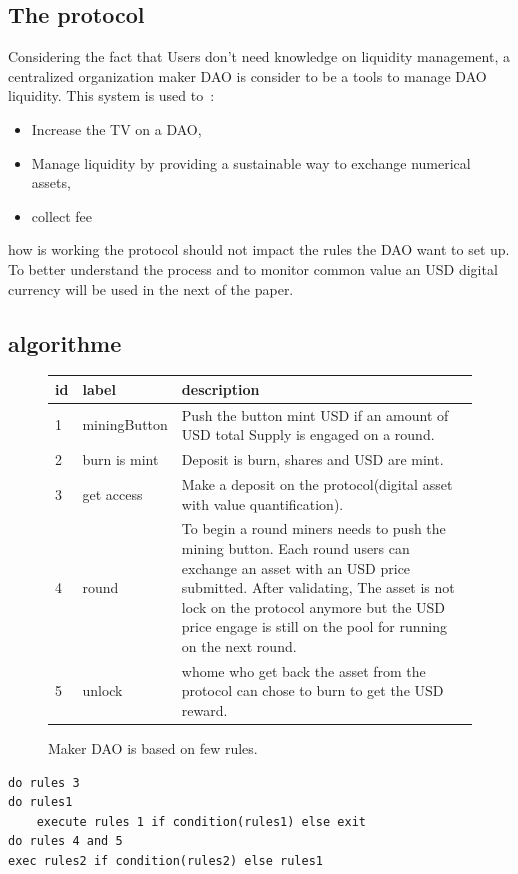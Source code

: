 \documentclass{article}
\begin{document}
\begin{multicols}{2}[]
\section{The protocol} 
Considering the fact that Users don’t need knowledge on liquidity management, a centralized organization maker DAO is consider to be a tools to manage DAO liquidity. This system is used to :
\begin{itemize}
	\item  Increase the TV on a DAO,
	\item Manage liquidity by providing a sustainable way to exchange numerical assets,
	\item collect fee 
\end{itemize}
how is working the protocol should not impact the rules the DAO want to set up. To better understand the process and to monitor common value an USD digital currency will be used in the next of the paper.
\subsection{algorithme}

\begin{figure}[H]
\begin{tabular}{ | m{0.1cm} | m{2cm}| m{5cm} | } 
\hline
id & label & description \\ \hline\hline
1 & miningButton & Push the button mint USD if an amount of USD total Supply is engaged on a round. \\ \hline
2 & burn is mint & Deposit is burn, shares and USD are mint. \\ \hline
3 & get access & Make a deposit on the protocol(digital asset with value quantification). \\ \hline
4 & round & To begin a round miners needs to push the mining button. Each round users can exchange an asset with an USD price submitted. After validating, The asset is not lock on the protocol anymore but the USD price engage is still on the pool for running on the next round. \\ \hline
5 & unlock & whome who get back the asset from the protocol can chose to burn to get the USD reward. \\ \hline\hline
\end{tabular}
\caption{Maker DAO is based on few rules.}
\label{table:1}
\end{figure}

\begin{verbatim}
do rules 3
do rules1
	execute rules 1 if condition(rules1) else exit
do rules 4 and 5
exec rules2 if condition(rules2) else rules1
\end{verbatim}


\end{multicols}
\end{document}
